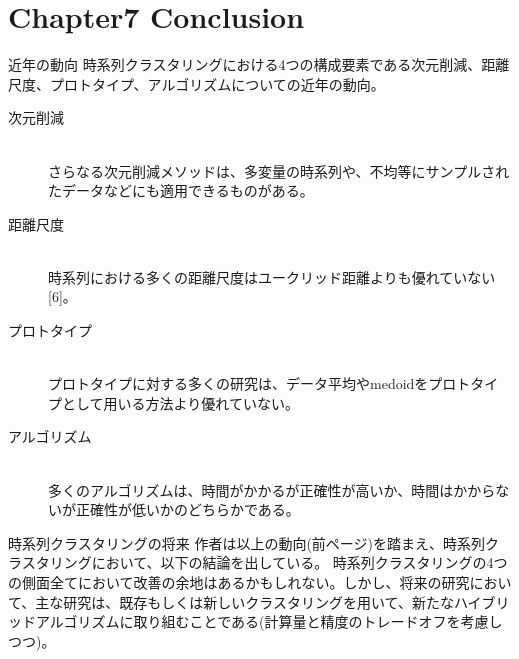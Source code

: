 \documentclass[dvipdfmx,11pt,notheorems]{beamer}
\theoremstyle{definition}
\begin{document}
\section{Chapter7 Conclusion}



\begin{frame}{近年の動向}
時系列クラスタリングにおける4つの構成要素である次元削減、距離尺度、プロトタイプ、アルゴリズムについての近年の動向。
\begin{description}
\item[次元削減] \mbox{}\\さらなる次元削減メソッドは、多変量の時系列や、不均等にサンプルされたデータなどにも適用できるものがある。
\item[距離尺度] \mbox{}\\時系列における多くの距離尺度はユークリッド距離よりも優れていない[6]。
\item[プロトタイプ] \mbox{}\\プロトタイプに対する多くの研究は、データ平均やmedoidをプロトタイプとして用いる方法より優れていない。
\item[アルゴリズム] \mbox{}\\多くのアルゴリズムは、時間がかかるが正確性が高いか、時間はかからないが正確性が低いかのどちらかである。
\end{description}

\end{frame}

\begin{frame}{時系列クラスタリングの将来}
作者は以上の動向(前ページ)を踏まえ、時系列クラスタリングにおいて、以下の結論を出している。\newline
\newline
時系列クラスタリングの4つの側面全てにおいて改善の余地はあるかもしれない。しかし、将来の研究において、主な研究は、既存もしくは新しいクラスタリングを用いて、新たなハイブリッドアルゴリズムに取り組むことである(計算量と精度のトレードオフを考慮しつつ)。

\end{frame}
\end{document}
